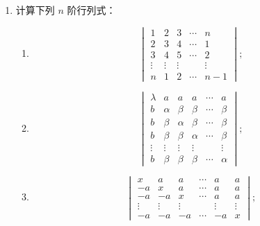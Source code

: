 \begin{enumerate}
\begin{enumerate}
\[\begin{vmatrix}
      \vdots&\vdots&&\vdots\\
      a_{n1}&a_{n2}&\cdots&a_{nn}
    \end{vmatrix}
    +x\sum_{i=1}^n\sum_{j=1}^n A_{ij},
    \]
    其中 $A_{ij}$ 是 $a_{ij}$ 的代数余子式；
  \anssub
    \item \[
    \sum_{i=1}^n\sum_{j=1}^n A_{ij}=
    \begin{vmatrix}
      a_{11}-a_{12}&a_{12}-a_{13}&\cdots&a_{1,n-1}-a_{1n}&1\\
      a_{21}-a_{22}&a_{22}-a_{23}&\cdots&a_{2,n-1}-a_{2n}&1\\
      \vdots&\vdots&&\vdots&\vdots\\
      a_{n1}-a_{n2}&a_{n2}-a_{n3}&\cdots&a_{n,n-1}-a_{nn}&1
    \end{vmatrix}.
    \]
  \anssub
  \end{enumerate}
  \item 计算下列 $n$ 阶行列式：
  \begin{enumerate}
    \item \[
    \begin{vmatrix}
      1&2&3&\cdots&n\\
      2&3&4&\cdots&1\\
      3&4&5&\cdots&2\\
      \vdots&\vdots&\vdots&&\vdots\\
      n&1&2&\cdots&n-1
    \end{vmatrix};
    \]
  \anssub
    \item \[
    \begin{vmatrix}
      \lambda&a&a&a&\cdots&a\\
      b&\alpha&\beta&\beta&\cdots&\beta\\
      b&\beta&\alpha&\beta&\cdots&\beta\\
      b&\beta&\beta&\alpha&\cdots&\beta\\
      \vdots&\vdots&\vdots&\vdots&&\vdots\\
      b&\beta&\beta&\beta&\cdots&\alpha
    \end{vmatrix};
    \]
  \anssub
    \item \[
    \begin{vmatrix}
      x&a&a&\cdots&a&a\\
      -a&x&a&\cdots&a&a\\
      -a&-a&x&\cdots&a&a\\
      \vdots&\vdots&\vdots&&\vdots&\vdots\\
      -a&-a&-a&\cdots&-a&x
    \end{vmatrix};
\]
\end{enumerate}
\end{enumerate}
